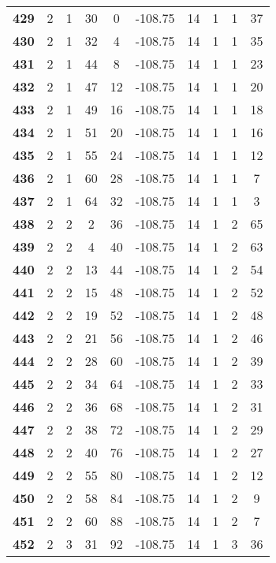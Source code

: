 \documentclass{article}%
\begin{document}
\begin{longtable}{cccccccccc}
        \textbf{429} & 2 & 1 & 30 & 0 & -108.75 & 14 & 1 & 1 & 37 \\ 
        \textbf{430} & 2 & 1 & 32 & 4 & -108.75 & 14 & 1 & 1 & 35 \\ 
        \textbf{431} & 2 & 1 & 44 & 8 & -108.75 & 14 & 1 & 1 & 23 \\ 
        \textbf{432} & 2 & 1 & 47 & 12 & -108.75 & 14 & 1 & 1 & 20 \\ 
        \textbf{433} & 2 & 1 & 49 & 16 & -108.75 & 14 & 1 & 1 & 18 \\ 
        \textbf{434} & 2 & 1 & 51 & 20 & -108.75 & 14 & 1 & 1 & 16 \\ 
        \textbf{435} & 2 & 1 & 55 & 24 & -108.75 & 14 & 1 & 1 & 12 \\ 
        \textbf{436} & 2 & 1 & 60 & 28 & -108.75 & 14 & 1 & 1 & 7 \\ 
        \textbf{437} & 2 & 1 & 64 & 32 & -108.75 & 14 & 1 & 1 & 3 \\ 
        \textbf{438} & 2 & 2 & 2 & 36 & -108.75 & 14 & 1 & 2 & 65 \\ 
        \textbf{439} & 2 & 2 & 4 & 40 & -108.75 & 14 & 1 & 2 & 63 \\ 
        \textbf{440} & 2 & 2 & 13 & 44 & -108.75 & 14 & 1 & 2 & 54 \\ 
        \textbf{441} & 2 & 2 & 15 & 48 & -108.75 & 14 & 1 & 2 & 52 \\ 
        \textbf{442} & 2 & 2 & 19 & 52 & -108.75 & 14 & 1 & 2 & 48 \\ 
        \textbf{443} & 2 & 2 & 21 & 56 & -108.75 & 14 & 1 & 2 & 46 \\ 
        \textbf{444} & 2 & 2 & 28 & 60 & -108.75 & 14 & 1 & 2 & 39 \\ 
        \textbf{445} & 2 & 2 & 34 & 64 & -108.75 & 14 & 1 & 2 & 33 \\ 
        \textbf{446} & 2 & 2 & 36 & 68 & -108.75 & 14 & 1 & 2 & 31 \\ 
        \textbf{447} & 2 & 2 & 38 & 72 & -108.75 & 14 & 1 & 2 & 29 \\ 
        \textbf{448} & 2 & 2 & 40 & 76 & -108.75 & 14 & 1 & 2 & 27 \\ 
        \textbf{449} & 2 & 2 & 55 & 80 & -108.75 & 14 & 1 & 2 & 12 \\ 
        \textbf{450} & 2 & 2 & 58 & 84 & -108.75 & 14 & 1 & 2 & 9 \\ 
        \textbf{451} & 2 & 2 & 60 & 88 & -108.75 & 14 & 1 & 2 & 7 \\ 
        \textbf{452} & 2 & 3 & 31 & 92 & -108.75 & 14 & 1 & 3 & 36 \\ 

\end{longtable}
\end{document}

